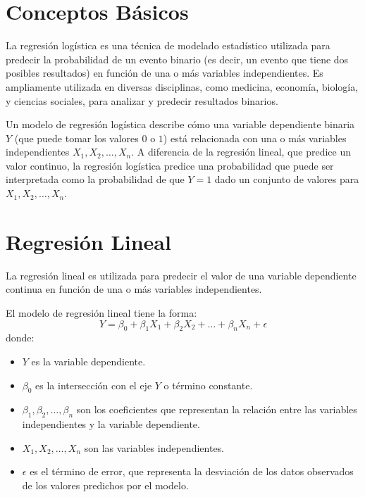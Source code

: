 \section{Conceptos Básicos}

La regresión logística es una técnica de modelado estadístico utilizada para predecir la probabilidad de un evento binario (es decir, un evento que tiene dos posibles resultados) en función de una o más variables independientes. Es ampliamente utilizada en diversas disciplinas, como medicina, economía, biología, y ciencias sociales, para analizar y predecir resultados binarios.

Un modelo de regresión logística describe cómo una variable dependiente binaria $Y$ (que puede tomar los valores $0$ o $1$) está relacionada con una o más variables independientes $X_1, X_2, \ldots, X_n$. A diferencia de la regresión lineal, que predice un valor continuo, la regresión logística predice una probabilidad que puede ser interpretada como la probabilidad de que $Y=1$ dado un conjunto de valores para $X_1, X_2, \ldots, X_n$.

\section{Regresión Lineal}

La regresión lineal es utilizada para predecir el valor de una variable dependiente continua en función de una o más variables independientes.


El modelo de regresión lineal tiene la forma:
\begin{equation}
Y = \beta_0 + \beta_1 X_1 + \beta_2 X_2 + \ldots + \beta_n X_n + \epsilon
\end{equation}
donde:
\begin{itemize}
    \item $Y$ es la variable dependiente.
    \item $\beta_0$ es la intersección con el eje $Y$ o término constante.
    \item $\beta_1, \beta_2, \ldots, \beta_n$ son los coeficientes que representan la relación entre las variables independientes y la variable dependiente.
    \item $X_1, X_2, \ldots, X_n$ son las variables independientes.
    \item $\epsilon$ es el término de error, que representa la desviación de los datos observados de los valores predichos por el modelo.
\end{itemize}

